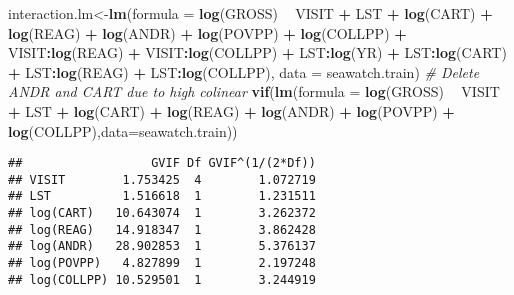 \documentclass[]{article}
\newenvironment{Shaded}{\begin{snugshade}}{\end{snugshade}}
\newcommand{\KeywordTok}[1]{\textcolor[rgb]{0.13,0.29,0.53}{\textbf{#1}}}
\newcommand{\DataTypeTok}[1]{\textcolor[rgb]{0.13,0.29,0.53}{#1}}
\newcommand{\StringTok}[1]{\textcolor[rgb]{0.31,0.60,0.02}{#1}}
\newcommand{\CommentTok}[1]{\textcolor[rgb]{0.56,0.35,0.01}{\textit{#1}}}
\newcommand{\OperatorTok}[1]{\textcolor[rgb]{0.81,0.36,0.00}{\textbf{#1}}}
\newcommand{\NormalTok}[1]{#1}
\begin{document}
\begin{Shaded}
\begin{Highlighting}[]
\NormalTok{interaction.lm<-}\KeywordTok{lm}\NormalTok{(}\DataTypeTok{formula =} \KeywordTok{log}\NormalTok{(GROSS) }\OperatorTok{~}\StringTok{ }\NormalTok{VISIT }\OperatorTok{+}\StringTok{ }\NormalTok{LST }\OperatorTok{+}\StringTok{ }\KeywordTok{log}\NormalTok{(CART) }\OperatorTok{+}\StringTok{ }\KeywordTok{log}\NormalTok{(REAG) }\OperatorTok{+}\StringTok{ }
\StringTok{    }\KeywordTok{log}\NormalTok{(ANDR) }\OperatorTok{+}\StringTok{ }\KeywordTok{log}\NormalTok{(POVPP) }\OperatorTok{+}\StringTok{ }\KeywordTok{log}\NormalTok{(COLLPP) }\OperatorTok{+}\StringTok{ }\NormalTok{VISIT}\OperatorTok{:}\KeywordTok{log}\NormalTok{(REAG) }\OperatorTok{+}\StringTok{ }
\StringTok{    }\NormalTok{VISIT}\OperatorTok{:}\KeywordTok{log}\NormalTok{(COLLPP) }\OperatorTok{+}\StringTok{ }\NormalTok{LST}\OperatorTok{:}\KeywordTok{log}\NormalTok{(YR) }\OperatorTok{+}\StringTok{ }\NormalTok{LST}\OperatorTok{:}\KeywordTok{log}\NormalTok{(CART) }\OperatorTok{+}\StringTok{ }\NormalTok{LST}\OperatorTok{:}\KeywordTok{log}\NormalTok{(REAG) }\OperatorTok{+}\StringTok{ }
\StringTok{    }\NormalTok{LST}\OperatorTok{:}\KeywordTok{log}\NormalTok{(COLLPP), }\DataTypeTok{data =}\NormalTok{ seawatch.train)}
\CommentTok{# Delete ANDR and CART due to high colinear}
\KeywordTok{vif}\NormalTok{(}\KeywordTok{lm}\NormalTok{(}\DataTypeTok{formula =} \KeywordTok{log}\NormalTok{(GROSS) }\OperatorTok{~}\StringTok{ }\NormalTok{VISIT }\OperatorTok{+}\StringTok{ }\NormalTok{LST }\OperatorTok{+}\StringTok{ }\KeywordTok{log}\NormalTok{(CART) }\OperatorTok{+}\StringTok{ }\KeywordTok{log}\NormalTok{(REAG) }\OperatorTok{+}\StringTok{ }
\StringTok{    }\KeywordTok{log}\NormalTok{(ANDR) }\OperatorTok{+}\StringTok{ }\KeywordTok{log}\NormalTok{(POVPP) }\OperatorTok{+}\StringTok{ }\KeywordTok{log}\NormalTok{(COLLPP),}\DataTypeTok{data=}\NormalTok{seawatch.train))}
\end{Highlighting}
\end{Shaded}

\begin{verbatim}
##                  GVIF Df GVIF^(1/(2*Df))
## VISIT        1.753425  4        1.072719
## LST          1.516618  1        1.231511
## log(CART)   10.643074  1        3.262372
## log(REAG)   14.918347  1        3.862428
## log(ANDR)   28.902853  1        5.376137
## log(POVPP)   4.827899  1        2.197248
## log(COLLPP) 10.529501  1        3.244919
\end{verbatim}
\end{document}
